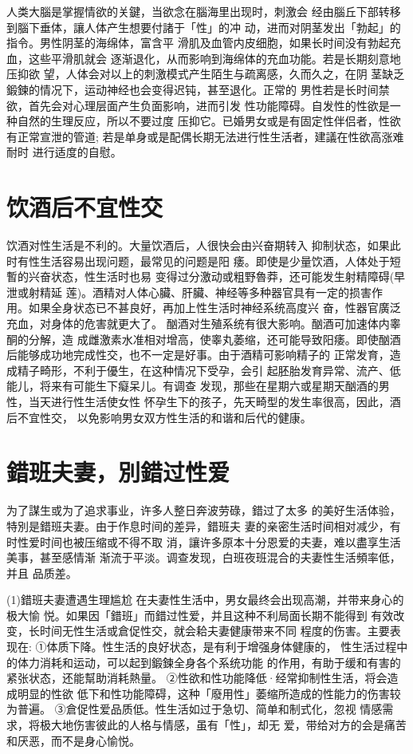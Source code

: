 \documentclass[12pt,UTF8]{ctexbook}
\begin{document}
人类大腦是掌握情欲的关鍵，当欲念在腦海里出现时，刺激会
经由腦丘下部转移到腦下垂体，讓人体产生想要付諸于「性」的冲
动，进而对阴茎发出「勃起」的指令。男性阴茎的海绵体，富含平
滑肌及血管内皮细胞，如果长时间没有勃起充血，这些平滑肌就会
逐渐退化，从而影响到海绵体的充血功能。若是长期刻意地压抑欲
望，人体会对以上的刺激模式产生陌生与疏离感，久而久之，在阴
茎缺乏鍛鍊的情况下，运动神经也会变得迟钝，甚至退化。正常的
男性若是长时间禁欲，首先会对心理层面产生负面影响，进而引发
性功能障碍。自发性的性欲是一种自然的生理反应，所以不要过度
压抑它。已婚男女或是有固定性伴侣者，性欲有正常宣泄的管道;
若是单身或是配偶长期无法进行性生活者，建議在性欲高涨难耐时
进行适度的自慰。

\section{饮酒后不宜性交}

饮酒对性生活是不利的。大量饮酒后，人很快会由兴奋期转入
抑制状态，如果此时有性生活容易出现问题，最常见的问题是阳
痿。即使是少量饮酒，人体处于短暫的兴奋状态，性生活时也易
变得过分激动或粗野魯莽，还可能发生射精障碍(早泄或射精延
莲)。酒精对人体心臟、肝臟、神经等多种器官具有一定的损害作
用。如果全身状态已不甚良好，再加上性生活时神经系统高度兴
奋，性器官廣泛充血，对身体的危害就更大了。
酗酒对生殖系统有很大影响。酗酒可加速体内睾酮的分解，造
成雌激素水准相对增高，使睾丸萎缩，还可能导致阳痿。即使酗酒
后能够成功地完成性交，也不一定是好事。由于酒精可影响精子的
正常发育，造成精子畸形，不利于優生，在这种情况下受孕，会引
起胚胎发育异常、流产、低能儿，将来有可能生下癡呆儿。有调查
发现，那些在星期六或星期天酗酒的男性，当天进行性生活使女性
怀孕生下的孩子，先天畸型的发生率很高，因此，酒后不宜性交，
以免影响男女双方性生活的和谐和后代的健康。

\section{錯班夫妻，別錯过性爱}

为了謀生或为了追求事业，许多人整日奔波劳碌，錯过了太多
的美好生活体验，特別是錯班夫妻。由于作息时间的差异，錯班夫
妻的亲密生活时间相对减少，有时性爱时间也被压缩或不得不取
消，讓许多原本十分恩爱的夫妻，难以盡享生活美事，甚至感情渐
渐流于平淡。调查发现，白班夜班混合的夫妻性生活頻率低，并且
品质差。

(1)錯班夫妻遭遇生理尴尬
在夫妻性生活中，男女最终会出现高潮，并带来身心的极大愉
悦。如果因「錯班」而錯过性爱，并且这种不利局面长期不能得到
有效改变，长时间无性生活或倉促性交，就会耠夫妻健康带来不同
程度的伤害。主要表现在:
①体质下降。性生活的良好状态，是有利于增强身体健康的，
性生活过程中的体力消耗和运动，可以起到鍛鍊全身各个系统功能
的作用，有助于缓和有害的紧张状态，还能幫助消耗熱量。
②性欲和性功能降低·经常抑制性生活，将会造成明显的性欲
低下和性功能障碍，这种「廢用性」萎缩所造成的性能力的伤害较
为普遍。
③倉促性爱品质低。性生活如过于急切、简单和制式化，忽视
情感需求，将极大地伤害彼此的人格与情感，虽有「性」，却无
爱，带给对方的会是痛苦和厌恶，而不是身心愉悦。
\end{document}
